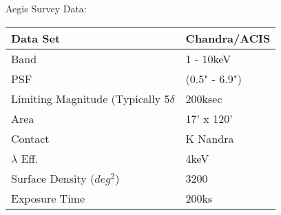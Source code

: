 \documentclass{article}
\begin{document}
 Aegis Survey Data: 
	\begin{center}
		\centering
		\begin{tabular}{| l | l |} 
			\hline Data Set & Chandra/ACIS \\
			\hline Band & 1 - 10keV  \\
			\hline PSF & (0.5" - 6.9") \\
			\hline Limiting Magnitude (Typically 5$\delta$ & 200ksec \\
			\hline Area & 17' x 120' \\
			\hline Contact & K Nandra \\
			\hline $\lambda$ Eff. & 4keV \\
			\hline Surface Density ($deg^2$) & 3200 \\
			\hline Exposure Time & 200ks \\
			\hline
		\end{tabular}
	\end{center} 
\end{document}
